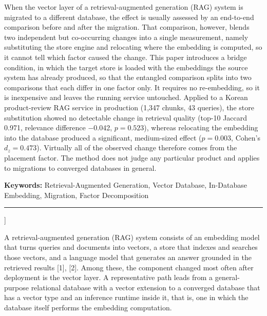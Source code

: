 \documentclass[10pt,a4paper,twocolumn]{article}
\newcommand{\pgsec}[1]{\par\vspace{5pt}{\bfseries\fontsize{12}{14}\selectfont #1}\par\nobreak\vspace{2pt}\nobreak}
\begin{document}
  \vspace{3pt}
  {\fontsize{8}{9.6}\selectfont
  When the vector layer of a retrieval-augmented generation (RAG) system is migrated to a different database, the effect is usually assessed by an end-to-end comparison before and after the migration. That comparison, however, blends two independent but co-occurring changes into a single measurement, namely substituting the store engine and relocating where the embedding is computed, so it cannot tell which factor caused the change. This paper introduces a bridge condition, in which the target store is loaded with the embeddings the source system has already produced, so that the entangled comparison splits into two comparisons that each differ in one factor only. It requires no re-embedding, so it is inexpensive and leaves the running service untouched. Applied to a Korean product-review RAG service in production (1,347 chunks, 43 queries), the store substitution showed no detectable change in retrieval quality (top-10 Jaccard 0.971, relevance difference $-$0.042, $p = 0.523$), whereas relocating the embedding into the database produced a significant, medium-sized effect ($p = 0.003$, Cohen's $d_z = 0.473$). Virtually all of the observed change therefore comes from the placement factor. The method does not judge any particular product and applies to migrations to converged databases in general.
  \par}
  \vspace{4pt}
  {\bfseries\fontsize{12}{14}\selectfont Keywords: }{\fontsize{8}{9.6}\selectfont Retrieval-Augmented Generation, Vector Database, In-Database Embedding, Migration, Factor Decomposition}\par
  \vspace{4pt}
  \noindent\rule{\linewidth}{0.6pt}\par
  \vspace{6pt}
]

\pgsec{1. Introduction}

A retrieval-augmented generation (RAG) system consists of an embedding model that turns queries and documents into vectors, a store that indexes and searches those vectors, and a language model that generates an answer grounded in the retrieved results [1], [2]. Among these, the component changed most often after deployment is the vector layer. A representative path leads from a general-purpose relational database with a vector extension to a converged database that has a vector type and an inference runtime inside it, that is, one in which the database itself performs the embedding computation.
\end{document}
